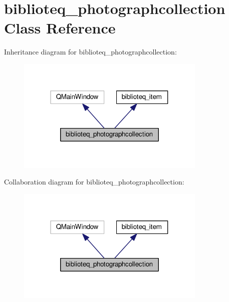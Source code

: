 \hypertarget{classbiblioteq__photographcollection}{}\section{biblioteq\+\_\+photographcollection Class Reference}
\label{classbiblioteq__photographcollection}


Inheritance diagram for biblioteq\+\_\+photographcollection\+:
\nopagebreak
\begin{figure}[H]
\begin{center}
\leavevmode
\includegraphics[width=256pt]{classbiblioteq__photographcollection__inherit__graph}
\end{center}
\end{figure}


Collaboration diagram for biblioteq\+\_\+photographcollection\+:
\nopagebreak
\begin{figure}[H]
\begin{center}
\leavevmode
\includegraphics[width=256pt]{classbiblioteq__photographcollection__coll__graph}
\end{center}
\end{figure}
